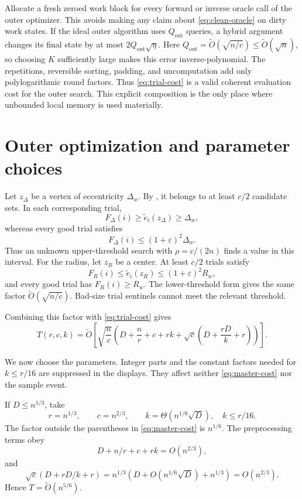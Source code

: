 \documentclass[11pt]{article}
\theoremstyle{definition}
\newcommand{\eps}{\varepsilon}
\newcommand{\diamw}{\Delta_w}
\newcommand{\radw}{R_w}
\newcommand{\wtO}{\widetilde O}
\begin{document}
Allocate a fresh zeroed work block for every forward or inverse oracle call of
the outer optimizer.  This avoids making any claim about
\eqref{eq:clean-oracle} on dirty work states.  If the ideal outer algorithm
uses $Q_{\mathrm{out}}$ queries, a hybrid argument changes its final state by
at most $2Q_{\mathrm{out}}\sqrt\eta$.  Here
$Q_{\mathrm{out}}=\wtO(\sqrt{n/c})\leq\wtO(\sqrt n)$, so choosing $K$
sufficiently large makes this error inverse-polynomial.  The repetitions,
reversible sorting, padding, and uncomputation add only polylogarithmic round
factors.  Thus \eqref{eq:trial-cost} is a valid coherent evaluation cost for
the outer search.  This explicit composition is the only place where
unbounded local memory is used materially.

\section{Outer optimization and parameter choices}
\label{sec:outer}

Let $z_\Delta$ be a vertex of eccentricity $\diamw$.  By
, it belongs to at least $c/2$ candidate sets.  In each
corresponding trial,
\[
  F_\Delta(i)\geq\widetilde e_i(z_\Delta)\geq\diamw,
\]
whereas every good trial satisfies
\[
  F_\Delta(i)\leq(1+\eps)^2\diamw.
\]
Thus an unknown upper-threshold search with $\rho=c/(2n)$ finds a value in
this interval.  For the radius, let $z_R$ be a center.  At least $c/2$ trials
satisfy
\[
  F_R(i)\leq\widetilde e_i(z_R)
  \leq(1+\eps)^2\radw,
\]
and every good trial has $F_R(i)\geq\radw$.  The lower-threshold form gives the
same factor $\wtO(\sqrt{n/c})$.  Bad-size trial sentinels cannot meet the
relevant threshold.

Combining this factor with \eqref{eq:trial-cost} gives
\[
  T(r,c,k)=
  \wtO\!\left[
    \sqrt{\frac nc}
    \left(
      D+\frac nr+c+rk
      +\sqrt c\left(D+\frac{rD}{k}+r\right)
    \right)
  \right].
  \tag{15}\label{eq:master-cost}
\]

We now choose the parameters.  Integer parts and the constant factors needed
for $k\leq r/16$ are suppressed in the displays.  They affect neither
\eqref{eq:master-cost} nor the sample event.

If $D\leq n^{1/3}$, take
\[
  r=n^{1/3},\qquad
  c=n^{2/3},\qquad
  k=\Theta(n^{1/6}\sqrt D),\quad k\leq r/16.
  \tag{16}\label{eq:small-D-parameters}
\]
The factor outside the parentheses in \eqref{eq:master-cost} is $n^{1/6}$.
The preprocessing terms obey
\[
  D+n/r+c+rk=O(n^{2/3}),
\]
and
\[
  \sqrt c\left(D+rD/k+r\right)
  =n^{1/3}\left(D+O(n^{1/6}\sqrt D)+n^{1/3}\right)
  =O(n^{2/3}).
\]
Hence $T=\wtO(n^{5/6})$.
\end{document}
